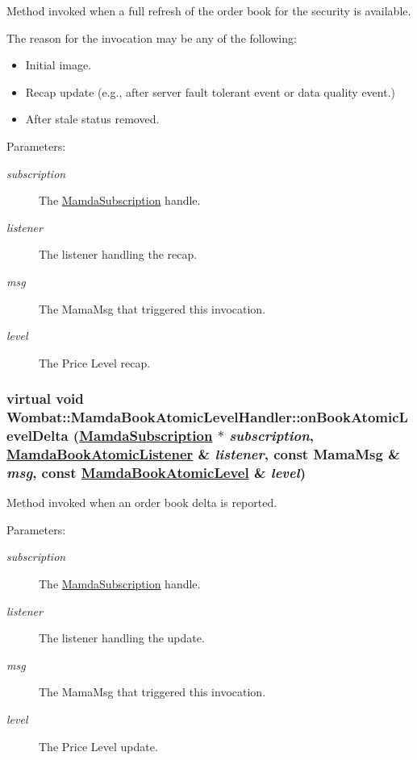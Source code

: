Method invoked when a full refresh of the order book for the security is available. 

The reason for the invocation may be any of the following:\begin{itemize}
\item Initial image.\item Recap update (e.g., after server fault tolerant event or data quality event.)\item After stale status removed.\end{itemize}


\begin{Desc}
\item[Parameters:]
\begin{description}
\item[{\em subscription}]The \hyperlink{classWombat_1_1MamdaSubscription}{Mamda\-Subscription} handle. \item[{\em listener}]The listener handling the recap. \item[{\em msg}]The Mama\-Msg that triggered this invocation. \item[{\em level}]The Price Level recap. \end{description}
\end{Desc}
\hypertarget{classWombat_1_1MamdaBookAtomicLevelHandler_657f1428d6744b3580ca814791d5a0b5}{
\subsubsection[onBookAtomicLevelDelta]{\setlength{\rightskip}{0pt plus 5cm}virtual void Wombat::Mamda\-Book\-Atomic\-Level\-Handler::on\-Book\-Atomic\-Level\-Delta (\hyperlink{classWombat_1_1MamdaSubscription}{Mamda\-Subscription} $\ast$ {\em subscription}, \hyperlink{classWombat_1_1MamdaBookAtomicListener}{Mamda\-Book\-Atomic\-Listener} \& {\em listener}, const Mama\-Msg \& {\em msg}, const \hyperlink{classWombat_1_1MamdaBookAtomicLevel}{Mamda\-Book\-Atomic\-Level} \& {\em level})}}
\label{classWombat_1_1MamdaBookAtomicLevelHandler_657f1428d6744b3580ca814791d5a0b5}


Method invoked when an order book delta is reported. 

\begin{Desc}
\item[Parameters:]
\begin{description}
\item[{\em subscription}]The \hyperlink{classWombat_1_1MamdaSubscription}{Mamda\-Subscription} handle. \item[{\em listener}]The listener handling the update. \item[{\em msg}]The Mama\-Msg that triggered this invocation. \item[{\em level}]The Price Level update. \end{description}
\end{Desc}
